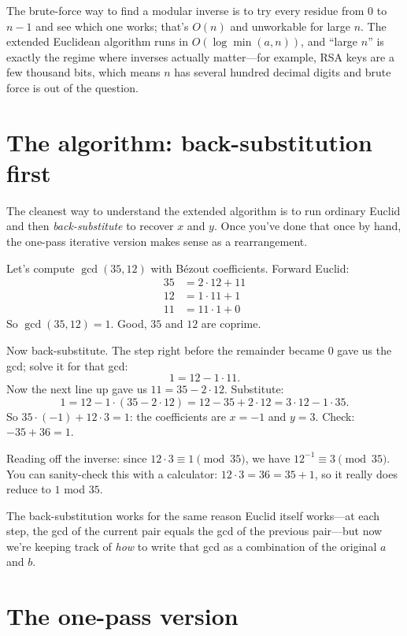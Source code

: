 \documentclass[11pt]{article}
\begin{document}
The brute-force way to find a modular inverse is to try every residue from $0$ to $n-1$ and see which one works; that's $O(n)$ and unworkable for large $n$. The extended Euclidean algorithm runs in $O(\log \min(a,n))$, and ``large $n$'' is exactly the regime where inverses actually matter---for example, RSA keys are a few thousand bits, which means $n$ has several hundred decimal digits and brute force is out of the question.

\section{The algorithm: back-substitution first}

The cleanest way to understand the extended algorithm is to run ordinary Euclid and then \emph{back-substitute} to recover $x$ and $y$. Once you've done that once by hand, the one-pass iterative version makes sense as a rearrangement.

Let's compute $\gcd(35, 12)$ with B\'ezout coefficients. Forward Euclid:
\begin{align*}
  35 &= 2 \cdot 12 + 11 \\
  12 &= 1 \cdot 11 + 1 \\
  11 &= 11 \cdot 1 + 0
\end{align*}
So $\gcd(35, 12) = 1$. Good, $35$ and $12$ are coprime.

Now back-substitute. The step right before the remainder became $0$ gave us the gcd; solve it for that gcd:
\[
  1 = 12 - 1 \cdot 11.
\]
Now the next line up gave us $11 = 35 - 2 \cdot 12$. Substitute:
\[
  1 = 12 - 1 \cdot (35 - 2 \cdot 12) = 12 - 35 + 2 \cdot 12 = 3 \cdot 12 - 1 \cdot 35.
\]
So $35 \cdot (-1) + 12 \cdot 3 = 1$: the coefficients are $x = -1$ and $y = 3$. Check: $-35 + 36 = 1$. \checkmark

Reading off the inverse: since $12 \cdot 3 \equiv 1 \pmod{35}$, we have $12^{-1} \equiv 3 \pmod{35}$. You can sanity-check this with a calculator: $12 \cdot 3 = 36 = 35 + 1$, so it really does reduce to $1$ mod $35$.

The back-substitution works for the same reason Euclid itself works---at each step, the gcd of the current pair equals the gcd of the previous pair---but now we're keeping track of \emph{how} to write that gcd as a combination of the original $a$ and $b$.

\section{The one-pass version}
\end{document}
